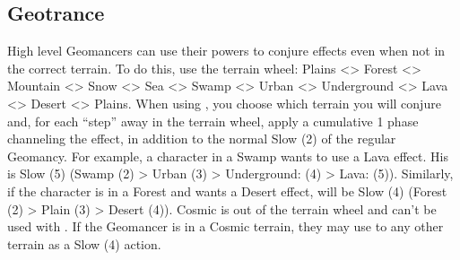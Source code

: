 \subsection*{Geotrance}\label{subsec:geo-trance}

\begin{multicols}{2}


High level Geomancers can use their powers to conjure effects even when not in the correct terrain. To do this, use the terrain wheel: Plains <> Forest <> Mountain <> Snow <> Sea <> Swamp <> Urban <> Underground <> Lava <> Desert <> Plains. When using , you choose which terrain you will conjure and, for each “step” away in the terrain wheel, apply a cumulative 1 phase channeling the effect, in addition to the normal Slow (2) of the regular Geomancy. For example, a character in a Swamp wants to use a Lava effect. His  is Slow (5) (Swamp (2) > Urban (3) > Underground: (4) > Lava: (5)). Similarly, if the character is in a Forest and wants a Desert effect,  will be Slow (4) (Forest (2) > Plain (3) > Desert (4)). Cosmic is out of the terrain wheel and can’t be used with . If the Geomancer is in a Cosmic terrain, they may use  to any other terrain as a Slow (4) action.


\begin{center}
\end{center}
\end{multicols}